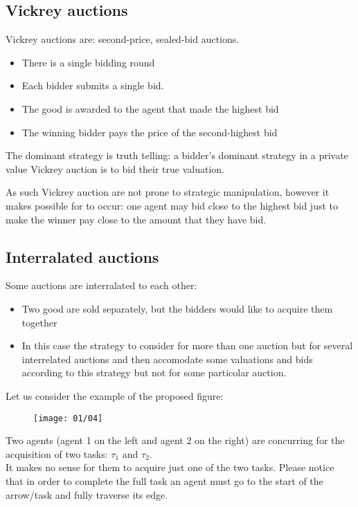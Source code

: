 \subsection{Vickrey auctions}
Vickrey auctions are: second-price, sealed-bid auctions.
\begin{itemize}
\item There is a single bidding round
\item Each bidder submits a single bid.
\item The good is awarded to the agent that made the highest bid
\item The winning bidder pays the price of the second-highest bid 
\end{itemize}

The dominant strategy is truth telling: a bidder's dominant strategy in a private value Vickrey auction is to bid their true valuation. 

As such Vickrey auction are not prone to strategic manipulation, however it makes possible for  to occur: one agent may bid close to the highest bid just to make the winner pay close to the amount that they have bid.
\subsection{Interralated auctions}
Some auctions are interralated to each other:
\begin{itemize}
\item Two good are sold separately, but the bidders would like to acquire them together
\item In this case the strategy to consider for more than one auction but for several interrelated auctions and then accomodate some valuations and  bids according to this strategy but not for some particolar auction. 
\end{itemize}

Let us consider the example of the proposed figure:

\begin{figure}[!h]
\centering
\texttt{[image: 01/04]}
\end{figure}

Two agents (agent 1 on the left and agent 2 on the right) are concurring for the acquisition of two tasks: $\tau_1$ and $\tau_2$.\\
It makes no sense for them to acquire just one of the two tasks. Please notice that in order to complete the full task an agent must go to the start of the arrow/task and fully traverse its edge.

